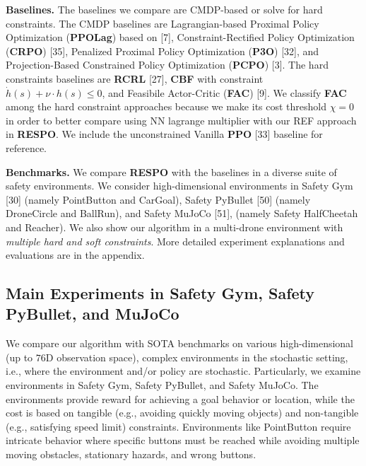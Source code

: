 \documentclass{article}
\theoremstyle{definition}
\begin{document}
\textbf{Baselines.} The baselines we compare are CMDP-based or solve for hard constraints. The CMDP baselines are Lagrangian-based Proximal Policy Optimization (\textbf{PPOLag}) based on [7], Constraint-Rectified Policy Optimization (\textbf{CRPO}) [35], Penalized Proximal Policy Optimization (\textbf{P3O}) [32], and Projection-Based Constrained Policy Optimization (\textbf{PCPO}) [3]. The hard constraints baselines are \textbf{RCRL} [27], \textbf{CBF} with constraint $\dot{h}(s) + \nu\cdot h(s)\leq 0$, and Feasibile Actor-Critic (\textbf{FAC}) [9]. We classify \textbf{FAC} among the hard constraint approaches because we make its cost threshold $\chi=0$ in order to better compare using NN lagrange multiplier with our REF approach in \textbf{RESPO}. We include the unconstrained Vanilla \textbf{PPO} [33] baseline for reference.

\textbf{Benchmarks.} We compare \textbf{RESPO} with the baselines in a diverse suite of safety environments. We consider high-dimensional environments in Safety Gym [30] (namely PointButton and CarGoal), Safety PyBullet [50] (namely DroneCircle and BallRun), and Safety MuJoCo [51], (namely Safety HalfCheetah and Reacher). We also show our algorithm in a multi-drone environment with \emph{multiple hard and soft constraints}. More detailed experiment explanations and evaluations are in the appendix.

\subsection{Main Experiments in Safety Gym, Safety PyBullet, and MuJoCo}
\label{section:SGE}
We compare our algorithm with SOTA benchmarks on various high-dimensional (up to $76$D observation space), complex environments in the stochastic setting, i.e., where the environment and/or policy are stochastic. Particularly, we examine environments in Safety Gym, Safety PyBullet, and Safety MuJoCo. The environments provide reward for achieving a goal behavior or location, while the cost is based on tangible (e.g., avoiding quickly moving objects) and non-tangible (e.g., satisfying speed limit) constraints. Environments like PointButton require intricate behavior where specific buttons must be reached while avoiding multiple moving obstacles, stationary hazards, and wrong buttons.
\end{document}
